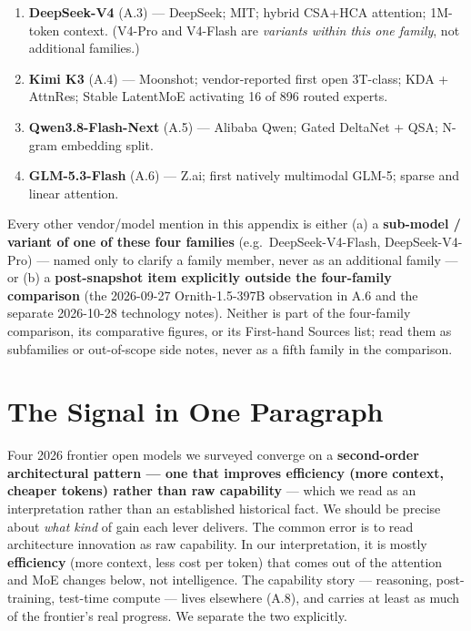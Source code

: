 \begin{enumerate}
\def\labelenumi{\arabic{enumi}.}
\tightlist
\item
  \textbf{DeepSeek-V4} (A.3) --- DeepSeek; MIT; hybrid CSA+HCA
  attention; 1M-token context. (V4-Pro and V4-Flash are \emph{variants
  within this one family}, not additional families.)
\item
  \textbf{Kimi K3} (A.4) --- Moonshot; vendor-reported first open
  3T-class; KDA + AttnRes; Stable LatentMoE activating 16 of 896 routed
  experts.
\item
  \textbf{Qwen3.8-Flash-Next} (A.5) --- Alibaba Qwen; Gated DeltaNet +
  QSA; N-gram embedding split.
\item
  \textbf{GLM-5.3-Flash} (A.6) --- Z.ai; first natively multimodal
  GLM-5; sparse and linear attention.
\end{enumerate}

Every other vendor/model mention in this appendix is either (a) a
\textbf{sub-model / variant of one of these four families}
(e.g.~DeepSeek-V4-Flash, DeepSeek-V4-Pro) --- named only to clarify a
family member, never as an additional family --- or (b) a
\textbf{post-snapshot item explicitly outside the four-family
comparison} (the 2026-09-27 Ornith-1.5-397B observation in A.6 and the
separate 2026-10-28 technology notes). Neither is part of the
four-family comparison, its comparative figures, or its First-hand
Sources list; read them as subfamilies or out-of-scope side notes, never
as a fifth family in the comparison.

\section{The Signal in One Paragraph}\label{the-signal-in-one-paragraph}

Four 2026 frontier open models we surveyed converge on a
\textbf{second-order architectural pattern --- one that improves
efficiency (more context, cheaper tokens) rather than raw capability}
--- which we read as an interpretation rather than an established
historical fact. We should be precise about \emph{what kind} of gain
each lever delivers. The common error is to read architecture innovation
as raw capability. In our interpretation, it is mostly
\textbf{efficiency} (more context, less cost per token) that comes out
of the attention and MoE changes below, not intelligence. The capability
story --- reasoning, post-training, test-time compute --- lives
elsewhere (A.8), and carries at least as much of the frontier's real
progress. We separate the two explicitly.

